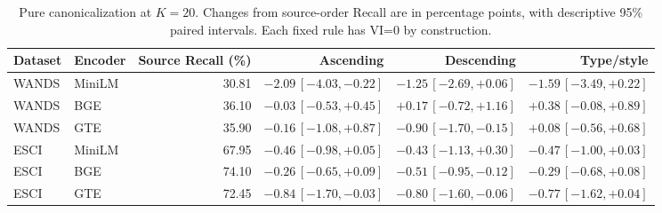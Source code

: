 \begin{table}[!t]
\centering
\caption{Pure canonicalization at $K=20$. Changes from source-order Recall are in percentage points, with descriptive 95\% paired intervals. Each fixed rule has VI=0 by construction.}
\label{tab:canonical_top20_intervals}
\small
\setlength{\tabcolsep}{5pt}
\begin{tabular}{llrrrr}
\toprule
Dataset & Encoder & Source Recall (\%) & Ascending & Descending & Type/style \\
\midrule
WANDS & MiniLM & 30.81 & $-2.09\,[-4.03,-0.22]$ & $-1.25\,[-2.69,+0.06]$ & $-1.59\,[-3.49,+0.22]$ \\
WANDS & BGE & 36.10 & $-0.03\,[-0.53,+0.45]$ & $+0.17\,[-0.72,+1.16]$ & $+0.38\,[-0.08,+0.89]$ \\
WANDS & GTE & 35.90 & $-0.16\,[-1.08,+0.87]$ & $-0.90\,[-1.70,-0.15]$ & $+0.08\,[-0.56,+0.68]$ \\
\midrule
ESCI & MiniLM & 67.95 & $-0.46\,[-0.98,+0.05]$ & $-0.43\,[-1.13,+0.30]$ & $-0.47\,[-1.00,+0.03]$ \\
ESCI & BGE & 74.10 & $-0.26\,[-0.65,+0.09]$ & $-0.51\,[-0.95,-0.12]$ & $-0.29\,[-0.68,+0.08]$ \\
ESCI & GTE & 72.45 & $-0.84\,[-1.70,-0.03]$ & $-0.80\,[-1.60,-0.06]$ & $-0.77\,[-1.62,+0.04]$ \\
\bottomrule
\end{tabular}
\end{table}

